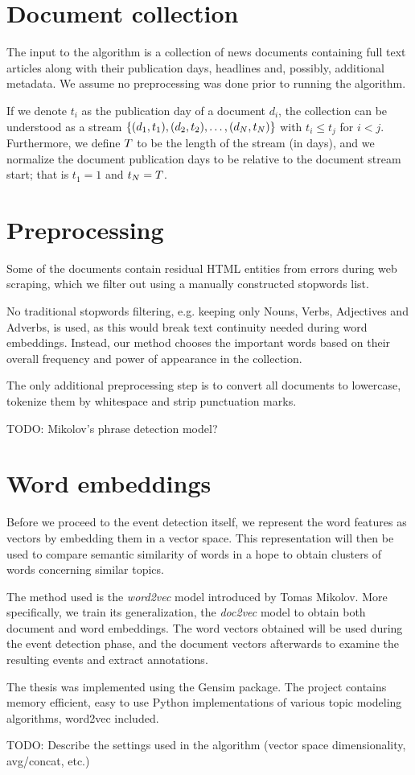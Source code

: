 \section{Document collection}
The input to the algorithm is a collection of news documents containing full text articles along with their publication days, headlines and, possibly, additional metadata. We assume no preprocessing was done prior to running the algorithm.

If we denote $t_{i}$ as the publication day of a document $d_{i}$, the collection can be understood as a stream $\left\{ (d_{1}, t_{1}), (d_{2}, t_{2}), \dots, (d_{N}, t_{N}) \right\}$ with $t_{i} \leq t_{j}$ for $i < j$. Furthermore, we define $T$ to be the length of the stream (in days), and we normalize the document publication days to be relative to the document stream start; that is $t_{1} = 1$ and $t_{N} = T$.


\section{Preprocessing}
Some of the documents contain residual HTML entities from errors during web scraping, which we filter out using a manually constructed stopwords list.

No traditional stopwords filtering, e.g. keeping only Nouns, Verbs, Adjectives and Adverbs, is used, as this would break text continuity needed during word embeddings. Instead, our method chooses the important words based on their overall frequency and power of appearance in the collection.

The only additional preprocessing step is to convert all documents to lowercase, tokenize them by whitespace and strip punctuation marks.

{\color{red} TODO: Mikolov's phrase detection model?}


\section{Word embeddings} \label{word-embeddings}
Before we proceed to the event detection itself, we represent the word features as vectors by embedding them in a vector space. This representation will then be used to compare semantic similarity of words in a hope to obtain clusters of words concerning similar topics.

The method used is the \textit{word2vec} model \cite{word2vec} introduced by Tomas Mikolov. More specifically, we train its generalization, the \textit{doc2vec} model \cite{doc2vec} to obtain both document and word embeddings. The word vectors obtained will be used during the event detection phase, and the document vectors afterwards to examine the resulting events and extract annotations.

The thesis was implemented using the Gensim \cite{gensim} package. The project contains memory efficient, easy to use Python implementations of various topic modeling algorithms, word2vec included.

{\color{red} TODO: Describe the settings used in the algorithm (vector space dimensionality, avg/concat, etc.)}
